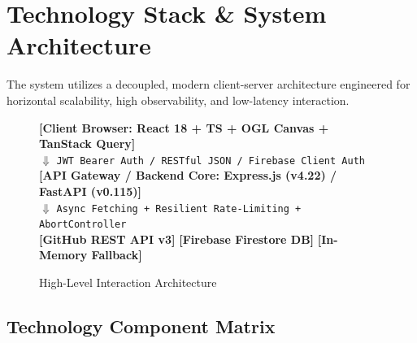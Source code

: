 \documentclass[11pt,a4paper]{article}
\begin{document}
\section{Technology Stack \& System Architecture}

The system utilizes a decoupled, modern client-server architecture engineered for horizontal scalability, high observability, and low-latency interaction.

\begin{figure}[htbp]
    \centering
    \begin{tcolorbox}[colback=white,colframe=bordercolor,arc=2mm,title=\textbf{System Architectural Flow}]
        \centering
        \textbf{[Client Browser: React 18 + TS + OGL Canvas + TanStack Query]} \\
        $\Downarrow$ \small\texttt{JWT Bearer Auth / RESTful JSON / Firebase Client Auth} \\
        \textbf{[API Gateway / Backend Core: Express.js (v4.22) / FastAPI (v0.115)]} \\
        $\Downarrow$ \small\texttt{Async Fetching + Resilient Rate-Limiting + AbortController} \\
        \textbf{[GitHub REST API v3]} \quad\textbar\quad \textbf{[Firebase Firestore DB]} \quad\textbar\quad \textbf{[In-Memory Fallback]}
    \end{tcolorbox}
    \caption{High-Level Interaction Architecture}
\end{figure}

\subsection{Technology Component Matrix}
\end{document}
